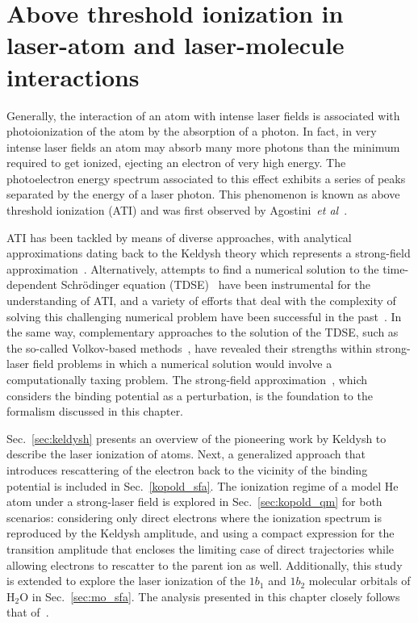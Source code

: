 \chapter{Above threshold ionization in laser-atom and laser-molecule interactions}
\label{cha:ati}


Generally, the interaction of an atom with intense laser fields is
associated with photoionization of the atom by the absorption of a
photon. In fact, in very intense laser fields an atom may absorb many
more photons than the minimum required to get ionized, ejecting an
electron of very high energy. The photoelectron energy spectrum
associated to this effect exhibits a series of peaks separated by the
energy of a laser photon. This phenomenon is known as above threshold
ionization (ATI) and was first observed by Agostini~\emph{et
  al}~\cite{ATI1979}.

ATI has been tackled by means of diverse approaches, with analytical
approximations dating back to the Keldysh theory which represents a
strong-field approximation~\cite{KeldyshSFA}. Alternatively, attempts
to find a numerical solution to the time-dependent Schr\"{o}dinger
equation (TDSE)~\cite{muller_tdse1999, scrinzi_tdse1999, Joachain2000}
have been instrumental for the understanding of ATI, and a variety of
efforts that deal with the complexity of solving this challenging
numerical problem have been successful in the
past~\cite{Becker_ati2002}. In the same way, complementary approaches
to the solution of the TDSE, such as the so-called Volkov-based
methods~\cite{Faisal_1973, Reiss_1980, Kaminski_1997}, have revealed
their strengths within strong-laser field problems in which a
numerical solution would involve a computationally taxing problem. The
strong-field approximation~\cite{KeldyshSFA}, which considers the
binding potential as a perturbation, is the foundation to the
formalism discussed in this chapter.

Sec.~\ref{sec:keldysh} presents an overview of the pioneering work by
Keldysh to describe the laser ionization of atoms. Next, a generalized
approach that introduces rescattering of the electron back to the
vicinity of the binding potential is included in
Sec.~\ref{kopold_sfa}. The ionization regime of a model He atom under
a strong-laser field is explored in Sec.~\ref{sec:kopold_qm} for both
scenarios: considering only direct electrons where the ionization
spectrum is reproduced by the Keldysh amplitude, and using a compact
expression for the transition amplitude that encloses the limiting
case of direct trajectories while allowing electrons to rescatter to
the parent ion as well. Additionally, this study is extended to
explore the laser ionization of the $1b_{1}$ and $1b_{2}$ molecular
orbitals of H$_{2}$O in Sec.~\ref{sec:mo_sfa}. The analysis presented
in this chapter closely follows that of~\cite{Kopold_1997sfa}.



